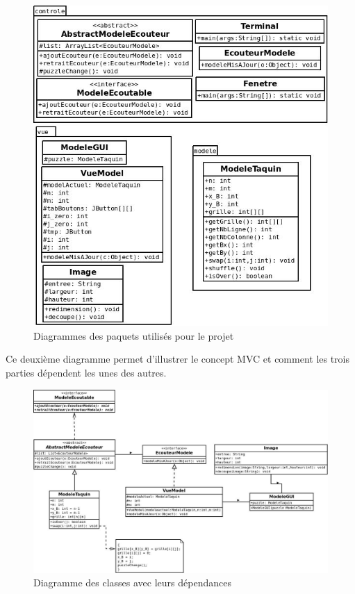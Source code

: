 \documentclass[french,12pt]{article}
\begin{document}
\begin{figure}[H]
    \begin{center}
    	\includegraphics[scale=0.4]{img/packages.jpg}
    \end{center}
    \caption{Diagrammes des paquets utilisés pour le projet}
\end{figure}

Ce deuxième diagramme permet d'illustrer le concept MVC et comment les trois parties dépendent les unes des autres. 

\begin{figure}[H]
    \begin{center}
    	\includegraphics[scale=0.2]{img/classes.jpg}
    \end{center}
    \caption{Diagramme des classes avec leurs dépendances}
\end{figure}
\end{document}
